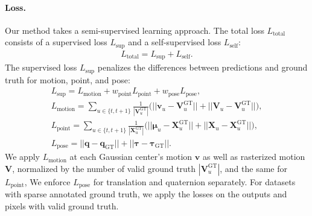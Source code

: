 \paragraph{Loss.}
Our method takes a semi-supervised learning approach.
The total loss $L_\text{total}$ consists of a supervised loss $L_\text{sup}$ and a self-supervised loss $L_\text{self}$:
\begin{align}
    L_\text{total} = L_\text{sup} + L_\text{self}.
    \label{eq:loss:total}
\end{align}
The supervised loss $L_\text{sup}$ penalizes the differences between predictions and ground truth for motion, point, and pose:
\begin{subequations}
\begin{gather}
 L_\text{sup} = L_\text{motion} + w_{\text{point}} L_\text{point} + w_{\text{pose}} L_\text{pose}, \\
 L_\text{motion} =  \textstyle\sum_{u \in \{t, t+1\}} \frac{1}{|\mathbf{V}^{\text{GT}}_u|} \big( || {\mathbf{v}}_u - \mathbf{V}^{\text{GT}}_u || + || {\mathbf{V}}_u - \mathbf{V}^{\text{GT}}_u || \big) \label{eq:loss:supervised:motion}, \\
 L_\text{point} = \textstyle\sum_{u \in \{t, t+1\}} \frac{1}{|\mathbf{X}^{\text{GT}}_u|} \big( || {\boldsymbol \mu}_u - \mathbf{X}^{\text{GT}}_{u} || + || \mathbf{X}_u - \mathbf{X}^{\text{GT}}_{u} || \big), \label{eq:loss:supervised:point} \\ 
 L_\text{pose} = || \mathbf{q} - \mathbf{q}_{\text{GT}} || + || \mathbf{\boldsymbol\tau} - \mathbf{\boldsymbol\tau}_{\text{GT}} ||.
\end{gather}
\label{eq:loss:supervised}
\end{subequations}
We apply $L_\text{motion}$ at each Gaussian center's motion $\mathbf{v}$ as well as rasterized motion $\mathbf{V}$, normalized by the number of valid ground truth $|\mathbf{V}^{\text{GT}}_u|$, and the same for $L_\text{point}$,
We enforce $L_\text{pose}$ for translation and quaternion separately. 
For datasets with sparse annotated ground truth, we apply the losses on the outputs and pixels with valid ground truth.

